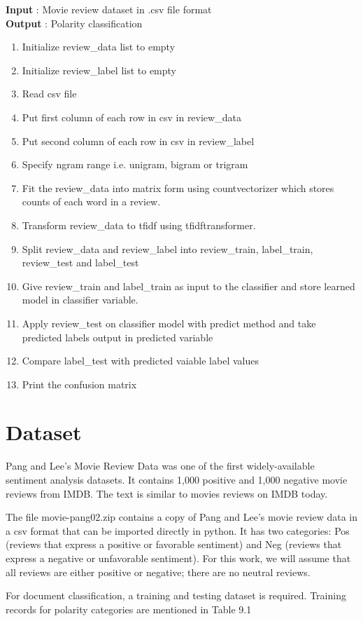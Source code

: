 \documentclass[oneside,a4paper,12pt]{pictreport}
\begin{document}
\textbf{Input} : Movie review dataset in .csv file format \\
\textbf{Output} : Polarity classification \\

\begin{enumerate}
\item Initialize review\_data list to empty
\item Initialize review\_label list to empty
\item Read csv file
\item Put first column of each row in csv in review\_data
\item Put second column of each row in csv in review\_label
\item Specify ngram range i.e. unigram, bigram or trigram
\item Fit the review\_data into matrix form using countvectorizer
which stores counts of each word in a review.
\item Transform review\_data to tfidf using tfidftransformer.
\item Split review\_data and review\_label into review\_train, 
label\_train, review\_test and label\_test
\item Give review\_train and label\_train as input to the classifier
and store learned model in classifier variable.
\item Apply review\_test on classifier model with predict method
and take predicted labels output in predicted variable
\item Compare label\_test with predicted vaiable label values
\item Print the confusion matrix
\end{enumerate}\section{Dataset}
\hspace{1.1cm} Pang and Lee's Movie Review Data was one of the first widely-available sentiment analysis datasets.
It contains 1,000 positive and 1,000 negative movie reviews from IMDB. The text is similar to movies reviews on IMDB today.

\par The file movie-pang02.zip contains a copy of Pang and Lee's movie review data in a
csv format that can be imported directly in python. It has two categories: Pos 
(reviews that express a positive or favorable sentiment) and Neg (reviews 
that express a negative or unfavorable sentiment). For this work, we will assume that
all reviews are either positive or negative; there are no neutral reviews. 
\par For document classification, a training and testing dataset is required. 
Training records for polarity categories are mentioned in Table 9.1
\end{document}
